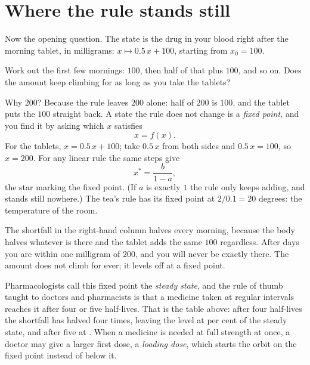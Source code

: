 \section{Where the rule stands still}
\label{sec:ch02-fixed}

\noindent
Now the opening question. The state is the drug in your blood right after
the morning tablet, in milligrams: $x \mapsto \num{0.5}\,x + 100$, starting
from $x_0 = 100$.

\begin{think}
Work out the first few mornings: $100$, then half of that plus $100$, and
so on. Does the amount keep climbing for as long as you take the tablets?
\end{think}
Why $200$? Because the rule leaves $200$ alone: half of $200$ is $100$, and
the tablet puts the $100$ straight back. A state the rule does not change is
a \emph{fixed point}, and you find it by asking which $x$ satisfies
\[ x = f(x) . \]
For the tablets, $x = \num{0.5}\,x + 100$; take $\num{0.5}\,x$ from both
sides and $\num{0.5}\,x = 100$, so $x = 200$. For any linear rule the same
steps give
\[ x^{*} = \frac{b}{1 - a} , \]
the star marking the fixed point. (If $a$ is exactly $1$ the rule only
keeps adding, and stands still nowhere.) The tea's rule has its fixed point
at $2 / \num{0.1} = 20$ degrees: the temperature of the room.



\noindent
The shortfall in the right-hand column halves every morning, because the
body halves whatever is there and the tablet adds the same $100$ regardless.
After  days you are within one milligram of $200$,
and you will never be exactly there. The amount does not climb for ever; it
levels off at a fixed point.

\begin{worldbox}
Pharmacologists call this fixed point the \emph{steady state}, and the rule
of thumb taught to doctors and pharmacists is that a medicine taken at
regular intervals reaches it after four or five half-lives. That is the
table above: after four half-lives the shortfall has halved four times,
leaving the level at  per cent of the steady state, and
after five at . When a medicine is needed at full
strength at once, a doctor may give a larger first dose, a \emph{loading
dose}, which starts the orbit on the fixed point instead of below it.
\end{worldbox}

